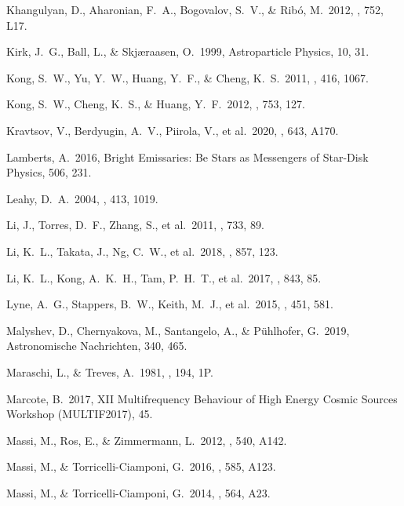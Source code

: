 \documentclass{aa}
\begin{document}
\begin{thebibliography}{}
 Khangulyan, D., Aharonian, F.~A., Bogovalov, S.~V., \& Rib{\'o}, M.\ 2012, \apjl, 752, L17.

 Kirk, J.~G., Ball, L., \& Skj{\ae}raasen, O.\ 1999, Astroparticle Physics, 10, 31.

 Kong, S.~W., Yu, Y.~W., Huang, Y.~F., \& Cheng, K.~S.\ 2011, \mnras, 416, 1067.

 Kong, S.~W., Cheng, K.~S., \& Huang, Y.~F.\ 2012, \apj, 753, 127.

 Kravtsov, V., Berdyugin, A.~V., Piirola, V., et al.\ 2020, \aap, 643, A170.

 Lamberts, A.\ 2016, Bright Emissaries: Be Stars as Messengers of Star-Disk Physics, 506, 231.

 Leahy, D.~A.\ 2004, \aap, 413, 1019.

 Li, J., Torres, D.~F., Zhang, S., et al.\ 2011, \apj, 733, 89.

 Li, K.~L., Takata, J., Ng, C.~W., et al.\ 2018, \apj, 857, 123.

 Li, K.~L., Kong, A.~K.~H., Tam, P.~H.~T., et al.\ 2017, \apj, 843, 85.

 Lyne, A.~G., Stappers, B.~W., Keith, M.~J., et al.\ 2015, \mnras, 451, 581.

 Malyshev, D., Chernyakova, M., Santangelo, A., \& P{\"u}hlhofer, G.\ 2019, Astronomische Nachrichten, 340, 465.

 Maraschi, L., \& Treves, A.\ 1981, \mnras, 194, 1P.

 Marcote, B.\ 2017, XII Multifrequency Behaviour of High Energy Cosmic Sources Workshop (MULTIF2017), 45.

 Massi, M., Ros, E., \& Zimmermann, L.\ 2012, \aap, 540, A142.

 Massi, M., \& Torricelli-Ciamponi, G.\ 2016, \aap, 585, A123.

 Massi, M., \& Torricelli-Ciamponi, G.\ 2014, \aap, 564, A23.


\end{thebibliography}
\end{document}
